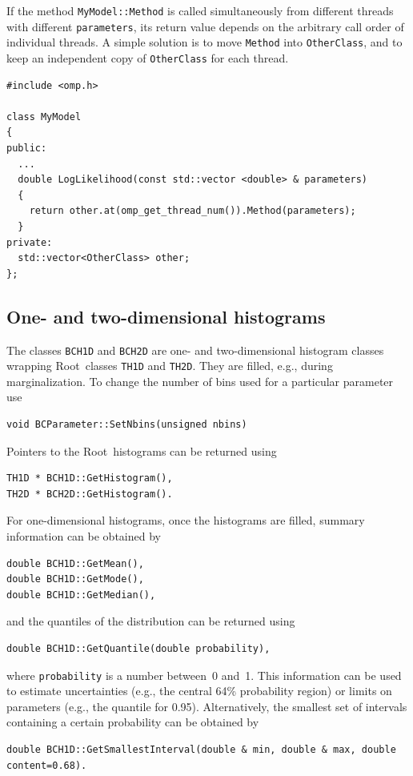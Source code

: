 \documentclass[11pt, a4paper]{article}
\newcommand{\Root}{{\sc Root}}
\begin{document}
If the method \texttt{MyModel::Method} is called simultaneously from
different threads with different \texttt{parameters}, its return value
depends on the arbitrary call order of individual threads.  A simple
solution is to move \texttt{Method} into \texttt{OtherClass}, and to
keep an independent copy of \texttt{OtherClass} for each thread.
\begin{verbatim}
#include <omp.h>

class MyModel
{
public:
  ...
  double LogLikelihood(const std::vector <double> & parameters)
  {
    return other.at(omp_get_thread_num()).Method(parameters);
  }
private:
  std::vector<OtherClass> other;
};

\end{verbatim}


\subsection{One- and two-dimensional histograms}
\label{sec:one-two-dim-hist}

The classes \verb|BCH1D| and \verb|BCH2D| are one- and two-dimensional
histogram classes wrapping \Root\ classes \verb|TH1D| and
\verb|TH2D|. They are filled, e.g., during marginalization. To change
the number of bins used for a particular parameter use
%
\begin{verbatim}
void BCParameter::SetNbins(unsigned nbins)
\end{verbatim}
%
Pointers to the \Root\ histograms can be returned
using
%
\begin{verbatim}
TH1D * BCH1D::GetHistogram(),
TH2D * BCH2D::GetHistogram().
\end{verbatim}
%
For one-dimensional histograms, once the histograms are filled,
summary information can be obtained by
%
\begin{verbatim}
double BCH1D::GetMean(),
double BCH1D::GetMode(),
double BCH1D::GetMedian(),
\end{verbatim}
%
and the quantiles of the distribution can be returned using
%
\begin{verbatim}
double BCH1D::GetQuantile(double probability),
\end{verbatim}
%
where \verb|probability| is a number between~0 and~1. This information
can be used to estimate uncertainties (e.g., the central 64\%
probability region) or limits on parameters (e.g., the quantile for
0.95). Alternatively, the smallest set of intervals containing a
certain probability can be obtained by
%
\begin{verbatim}
double BCH1D::GetSmallestInterval(double & min, double & max, double content=0.68).
\end{verbatim}
\end{document}
